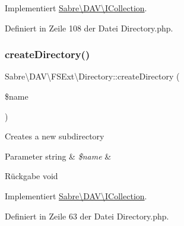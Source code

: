 Implementiert \mbox{\hyperlink{interface_sabre_1_1_d_a_v_1_1_i_collection_a81b44dc1354370890279af58c34c7375}{Sabre\textbackslash{}\+D\+A\+V\textbackslash{}\+I\+Collection}}.



Definiert in Zeile 108 der Datei Directory.\+php.

\mbox{\label{class_sabre_1_1_d_a_v_1_1_f_s_ext_1_1_directory_a14dbd580c21095860343679d4a407b41}} 
\subsubsection{\texorpdfstring{create\+Directory()}{createDirectory()}}
{\footnotesize\ttfamily Sabre\textbackslash{}\+D\+A\+V\textbackslash{}\+F\+S\+Ext\textbackslash{}\+Directory\+::create\+Directory (\begin{DoxyParamCaption}\item[{}]{\$name }\end{DoxyParamCaption})}

Creates a new subdirectory


\begin{DoxyParams}[1]{Parameter}
string & {\em \$name} & \\
\hline
\end{DoxyParams}
\begin{DoxyReturn}{Rückgabe}
void 
\end{DoxyReturn}


Implementiert \mbox{\hyperlink{interface_sabre_1_1_d_a_v_1_1_i_collection_a11e8eb888fffe1d792acebbe5bc59243}{Sabre\textbackslash{}\+D\+A\+V\textbackslash{}\+I\+Collection}}.



Definiert in Zeile 63 der Datei Directory.\+php.

\mbox{\label{class_sabre_1_1_d_a_v_1_1_f_s_ext_1_1_directory_af0c5ff461938c2cc3ab1b474166a5d57}} 
